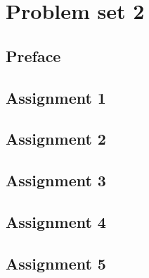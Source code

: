 \section{Problem set 2}
\subsection{Preface}
\subsection{Assignment 1}
\subsection{Assignment 2}
\subsection{Assignment 3}
\subsection{Assignment 4}
\subsection{Assignment 5}